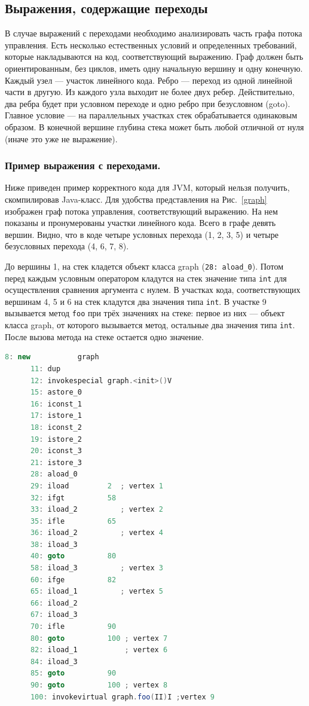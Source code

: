 \subsection{Выражения, содержащие переходы}
В случае выражений с переходами необходимо анализировать часть графа потока управления. Есть несколько естественных условий и определенных требований, которые накладываются на код, соответствующий выражению. Граф должен быть ориентированным, без циклов, иметь одну начальную вершину и одну конечную. Каждый узел --- участок линейного кода. Ребро --- переход из одной линейной части в другую. Из каждого узла выходит не более двух ребер. Действительно, два ребра будет при условном переходе и одно ребро при безусловном (goto). Главное условие --- на параллельных участках стек обрабатывается одинаковым образом. В конечной вершине глубина стека может быть любой отличной от нуля (иначе это уже не выражение).

\subsubsection{Пример выражения с переходами.}

Ниже приведен пример корректного кода для JVM, который нельзя получить, скомпилировав Java-класс. Для удобства представления на Рис.~\ref{graph} изображен граф потока управления, 
соответствующий выражению. На нем показаны и пронумерованы участки линейного кода. Всего в графе девять вершин. Видно, что в коде четыре условных перехода (1, 2, 3, 5) и четыре 
безусловных перехода (4, 6, 7, 8). 

До вершины 1, на стек кладется объект класса graph (\texttt{28: aload\_0}). Потом перед каждым условным оператором кладутся на стек значение типа \texttt{int} для осуществления 
сравнения аргумента с нулем. В участках кода, соответствующих вершинам 4, 5 и 6 на стек кладутся два значения типа \texttt{int}. В участке 9 вызывается метод \texttt{foo} 
при трёх значениях на стеке: первое из них --- объект класса graph, от которого вызывается метод, остальные два значения типа \texttt{int}. После вызова метода на стеке остается одно значение.

\begin{lstlisting}[language = JAVA]
       8: new           graph                  
      11: dup
      12: invokespecial graph.<init>()V                 
      15: astore_0
      16: iconst_1
      17: istore_1
      18: iconst_2
      19: istore_2
      20: iconst_3
      21: istore_3
      28: aload_0  
      29: iload         2  ; vertex 1
      32: ifgt          58 
      33: iload_2          ; vertex 2
      35: ifle          65 
      36: iload_2          ; vertex 4     
      38: iload_3
      40: goto          80 
      58: iload_3          ; vertex 3
      60: ifge          82 
      65: iload_1          ; vertex 5
      66: iload_2
      67: iload_3
      70: ifle          90     
      80: goto          100 ; vertex 7
      82: iload_1           ; vertex 6
      84: iload_3
      85: goto          90
      90: goto          100 ; vertex 8
      100: invokevirtual graph.foo(II)I ;vertex 9
\end{lstlisting}

